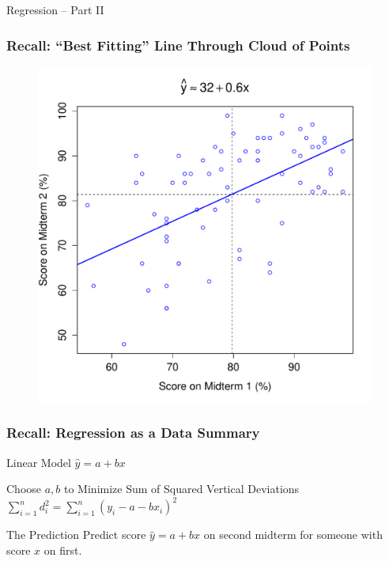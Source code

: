 \documentclass[handout]{beamer}
\date{Lecture 24}
\begin{document}
 





\begin{frame}[plain]
	\titlepage 
	

\end{frame} 



\begin{frame}
\begin{center}
	\huge Regression -- Part II
\end{center}
\end{frame}
\begin{frame}
\frametitle{Recall: ``Best Fitting'' Line Through Cloud of Points}
\begin{figure}
	\includegraphics[scale = 0.48]{./images/midterms5}
\end{figure}
\end{frame}
\begin{frame}
\frametitle{Recall: Regression as a Data Summary}
\begin{block}{Linear Model}
$\hat{y} = a + b x$
\end{block}
\begin{block}{Choose $a,b$ to Minimize Sum of Squared Vertical Deviations}
$\displaystyle\sum_{i = 1}^n d_i^2 = \sum_{i=1}^n (y_i - a - b x_i)^2$
\end{block}

\begin{block}{The Prediction}
Predict score $\hat{y} = a + b x$ on second midterm for someone with score $x$ on first.
\end{block}

\end{frame}
\end{document}

